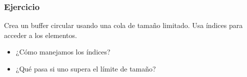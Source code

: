 \documentclass[11pt]{beamer}
\begin{document}
\begin{frame}\frametitle{Ejercicio}
\begin{block}{}
\Huge\centering Crea un buffer circular usando una cola de tamaño limitado. Usa índices para acceder a los elementos.
\end{block}
\begin{itemize}
\item ¿Cómo manejamos los índices?
\item ¿Qué pasa si uno supera el límite de tamaño?
\end{itemize}
\end{frame}
\end{document}
